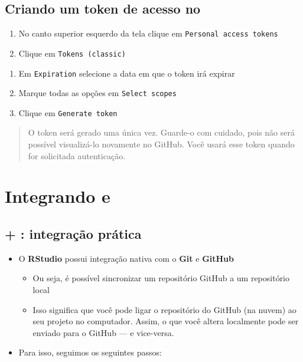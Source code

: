 \documentclass[
  letterpaper,
  DIV=11,
  numbers=noendperiod]{scrartcl}
\begin{document}
\subsection{\texorpdfstring{Criando um token de acesso no
}{Criando um token de acesso no }}\label{criando-um-token-de-acesso-no-2}

\begin{enumerate}
\def\labelenumi{\arabic{enumi}.}
\setcounter{enumi}{3}
\item
  No canto superior esquerdo da tela clique em
  \texttt{Personal\ access\ tokens}
\item
  Clique em \texttt{Tokens\ (classic)}
\end{enumerate}

\begin{enumerate}
\def\labelenumi{\arabic{enumi}.}
\setcounter{enumi}{5}
\item
  Em \texttt{Expiration} selecione a data em que o token irá expirar
\item
  Marque todas as opções em \texttt{Select\ scopes}
\item
  Clique em \texttt{Generate\ token}
\end{enumerate}

\begin{quote}
O token será gerado uma única vez. Guarde-o com cuidado, pois não será
possível visualizá-lo novamente no GitHub. Você usará esse token quando
for solicitada autenticação.
\end{quote}

\section{\texorpdfstring{Integrando e
}{Integrando  e }}\label{integrando-e}

\subsection{\texorpdfstring{ + : integração
prática}{ + : integração prática}}\label{integrauxe7uxe3o-pruxe1tica}

\begin{itemize}
\item
  O \textbf{RStudio} possui integração nativa com o \textbf{Git} e
  \textbf{GitHub}

  \begin{itemize}
  \item
    Ou seja, é possível sincronizar um repositório GitHub a um
    repositório local
  \item
    Isso significa que você pode ligar o repositório do GitHub (na
    nuvem) ao seu projeto no computador. Assim, o que você altera
    localmente pode ser enviado para o GitHub --- e vice-versa.
  \end{itemize}
\item
  Para isso, seguimos os seguintes passos:
\end{itemize}
\end{document}
